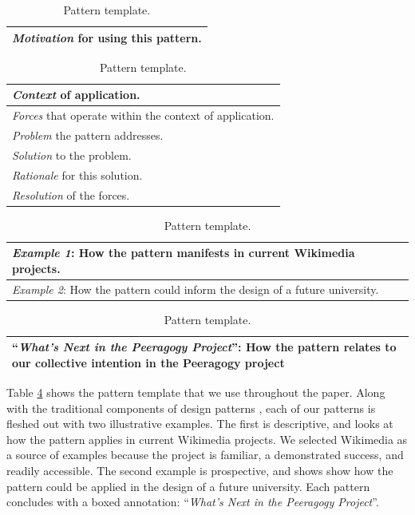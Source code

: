 \begin{table}
\vspace{-.60cm}
\begin{tabular}{|p{}|}
\hline
\emph{Motivation} for using this pattern.\\ \hline
\end{tabular}
\vspace{.1cm}

\begin{tabular}{|p{}|}
\hline
\emph{Context} of application.\\ \hline
\emph{Forces} that operate within the context of application. \\ \hline
\emph{Problem} the pattern addresses.\\ \hline
\emph{Solution} to the problem.\\ \hline
\emph{Rationale} for this solution.\\ \hline
\emph{Resolution} of the forces.\\ \hline
\end{tabular}
\vspace{.1cm}

\begin{tabular}{|p{}|}
\hline
\emph{Example 1}: How the pattern manifests in current Wikimedia projects.\\ \hline
\emph{Example 2}: How the pattern could inform the design of a future university.\\ \hline
\end{tabular}
\vspace{.1cm}

\begin{tabular}{|p{}|}
\hline
``\emph{What's Next in the Peeragogy Project}'': How the pattern relates to our collective intention in the Peeragogy project\\ \hline
\end{tabular}
\vspace{-.1cm}
\caption{Pattern template.\label{tab:pattern-template}}
\vspace{-.6cm}
\end{table}

Table \ref{tab:pattern-template} shows the pattern template that we use throughout the paper.  
Along with the traditional components of design patterns \cite{meszaros1998pattern}, each of our patterns is fleshed out with two illustrative examples.  The first is descriptive, and looks at how the pattern applies in current Wikimedia projects.  We selected Wikimedia as a source of examples because the project is familiar, a demonstrated success, and readily accessible.  The second example is prospective, and shows show how the pattern could be applied in the design of a future university.  Each pattern concludes with a boxed annotation: ``\emph{What's Next in the Peeragogy Project}''.

